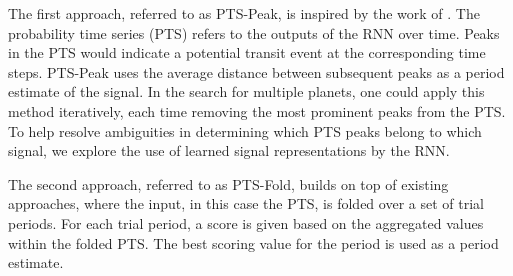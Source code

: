 The first approach, referred to as PTS-Peak, is inspired by the work of \cite{pearson2018searching}. The probability time series (PTS) refers to the outputs of the RNN over time. Peaks in the PTS would indicate a potential transit event at the corresponding time steps. PTS-Peak uses the average distance between subsequent peaks as a period estimate of the signal. In the search for multiple planets, one could apply this method iteratively, each time removing the most prominent peaks from the PTS. To help resolve ambiguities in determining which PTS peaks belong to which signal, we explore the use of learned signal representations by the RNN.

The second approach, referred to as PTS-Fold, builds on top of existing approaches, where the input, in this case the PTS, is folded over a set of trial periods. For each trial period, a score is given based on the aggregated values within the folded PTS. The best scoring value for the period is used as a period estimate.